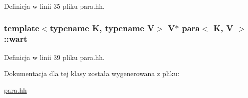 \-Definicja w linii 35 pliku para.\-hh.

\hypertarget{classpara_a10ac672de7a450df5c04b65a78e9d1d4}{
\subsubsection[{wart}]{\setlength{\rightskip}{0pt plus 5cm}template$<$typename \-K, typename \-V$>$ \-V$\ast$ {\bf para}$<$ \-K, \-V $>$\-::{\bf wart}}}\label{classpara_a10ac672de7a450df5c04b65a78e9d1d4}


\-Definicja w linii 39 pliku para.\-hh.



\-Dokumentacja dla tej klasy została wygenerowana z pliku\-:\begin{DoxyCompactItemize}
\item 
\hyperlink{para_8hh}{para.\-hh}\end{DoxyCompactItemize}
